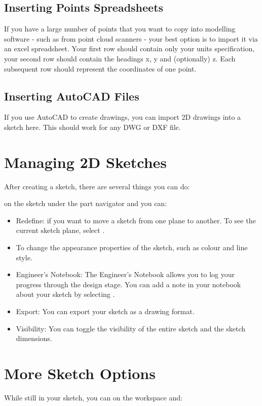 \begin{enumerate}
\subsection{Inserting Points Spreadsheets}
If you have a large number of points that you want to copy into modelling software - such as from point cloud scanners - your best option is to import it via an excel spreadsheet. Your first row should contain only your units specification, your second row should contain the headings x, y and (optionally) z. Each subsequent row should represent the coordinates of one point.

\subsection{Inserting AutoCAD Files}
If you use AutoCAD to create drawings, you can import 2D drawings into a sketch here. This should work for any DWG or DXF file.

\section{Managing 2D Sketches}
After creating a sketch, there are several things you can do:

 on the sketch under the part navigator and you can:
\begin{itemize}
\item Redefine: if you want to move a sketch from one plane to another. To see the current sketch plane, select .
\item To change the appearance properties of the sketch, such as colour and line style.
\item Engineer's Notebook: The Engineer's Notebook allows you to log your progress through the design stage. You can add a note in your notebook about your sketch by selecting .
\item Export: You can export your sketch as a drawing format.
\item Visibility: You can toggle the visibility of the entire sketch and the sketch dimensions.
\end{itemize}

\section{More Sketch Options}
While still in your sketch, you can  on the workspace and:


\end{enumerate}
